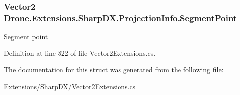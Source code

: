 \subsubsection[{Segment\+Point}]{\setlength{\rightskip}{0pt plus 5cm}Vector2 Drone.\+Extensions.\+Sharp\+D\+X.\+Projection\+Info.\+Segment\+Point}\label{struct_drone_1_1_extensions_1_1_sharp_d_x_1_1_projection_info_aca88a5f469770c319998dbbbb59b4e8c}


Segment point 



Definition at line 822 of file Vector2\+Extensions.\+cs.



The documentation for this struct was generated from the following file\+:\begin{DoxyCompactItemize}
\item 
Extensions/\+Sharp\+D\+X/Vector2\+Extensions.\+cs\end{DoxyCompactItemize}
